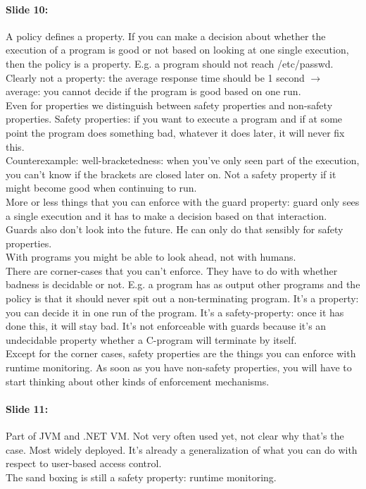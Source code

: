 \documentclass[10pt,a4paper]{report}
\begin{document}
\paragraph{Slide 10:} A policy defines a property. If you can make a decision about whether the execution of a program is good or not based on looking at one single execution, then the policy is a property. E.g. a program should not reach /etc/passwd. Clearly not a property: the average response time should be 1 second $\rightarrow$ average: you cannot decide if the program is good based on one run.\\
Even for properties we distinguish between safety properties and non-safety properties. Safety properties: if you want to execute a program and if at some point the program does something bad, whatever it does later, it will never fix this.\\
Counterexample: well-bracketedness: when you've only seen part of the execution, you can't know if the brackets are closed later on. Not a safety property if it might become good when continuing to run.\\
More or less things that you can enforce with the guard property: guard only sees a single execution and it has to make a decision based on that interaction. Guards also don't look into the future. He can only do that sensibly for safety properties. \\
With programs you might be able to look ahead, not with humans.\\
There are corner-cases that you can't enforce. They have to do with whether badness is decidable or not. E.g. a program has as output other programs and the policy is that it should never spit out a non-terminating program. It's a property: you can decide it in one run of the program. It's a safety-property: once it has done this, it will stay bad. It's not enforceable with guards because it's an undecidable property whether a C-program will terminate by itself.\\
Except for the corner cases, safety properties are the things you can enforce with runtime monitoring.
As soon as you have non-safety properties, you will have to start thinking about other kinds of enforcement mechanisms.

\paragraph{Slide 11:} Part of JVM and .NET VM. Not very often used yet, not clear why that's the case. Most widely deployed. It's already a generalization of what you can do with respect to user-based access control.\\
The sand boxing is still a safety property: runtime monitoring. 
\end{document}
